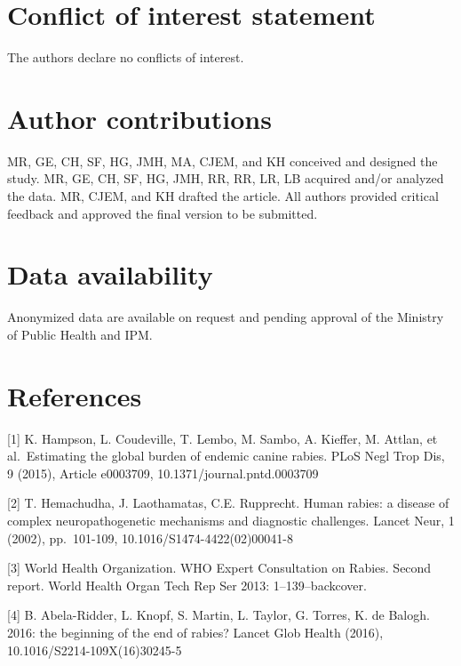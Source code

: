 \documentclass[
  oneside]{book}
\begin{document}
\hypertarget{conflict-of-interest-statement}{%
\section{Conflict of interest statement}\label{conflict-of-interest-statement}}

The authors declare no conflicts of interest.

\hypertarget{author-contributions}{%
\section{Author contributions}\label{author-contributions}}

MR, GE, CH, SF, HG, JMH, MA, CJEM, and KH conceived and designed the study. MR, GE, CH, SF, HG, JMH, RR, RR, LR, LB acquired and/or analyzed the data. MR, CJEM, and KH drafted the article. All authors provided critical feedback and approved the final version to be submitted.

\hypertarget{data-availability}{%
\section{Data availability}\label{data-availability}}

Anonymized data are available on request and pending approval of the Ministry of Public Health and IPM.

\hypertarget{references-1}{%
\section{References}\label{references-1}}

\setlength{\parskip}{1em}

{[}1{]} K. Hampson, L. Coudeville, T. Lembo, M. Sambo, A. Kieffer, M. Attlan, et al.~Estimating the global burden of endemic canine rabies. PLoS Negl Trop Dis, 9 (2015), Article e0003709, 10.1371/journal.pntd.0003709

{[}2{]} T. Hemachudha, J. Laothamatas, C.E. Rupprecht. Human rabies: a disease of complex neuropathogenetic mechanisms and diagnostic challenges. Lancet Neur, 1 (2002), pp.~101-109, 10.1016/S1474-4422(02)00041-8

{[}3{]} World Health Organization. WHO Expert Consultation on Rabies. Second report. World Health Organ Tech Rep Ser 2013: 1--139--backcover.

{[}4{]} B. Abela-Ridder, L. Knopf, S. Martin, L. Taylor, G. Torres, K. de Balogh. 2016: the beginning of the end of rabies? Lancet Glob Health (2016), 10.1016/S2214-109X(16)30245-5
\end{document}
